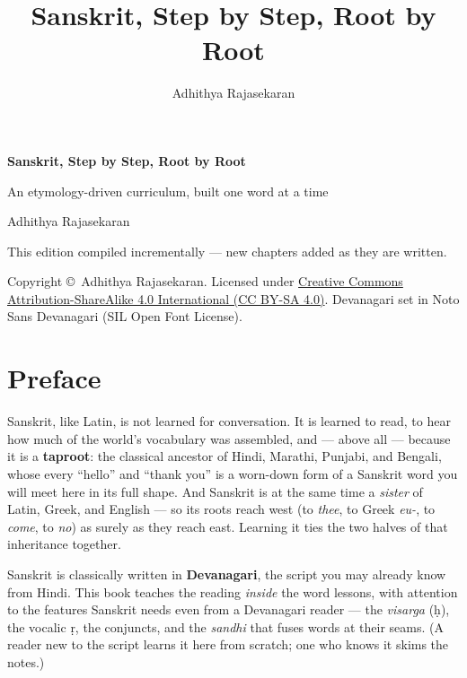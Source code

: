 \documentclass[11pt,twoside]{book}
\title{\Huge Sanskrit, Step by Step, Root by Root}
\author{Adhithya Rajasekaran}
\date{}
\begin{document}
\frontmatter

\begin{titlepage}
  \centering
  \vspace*{3cm}
  {\Huge\bfseries Sanskrit, Step by Step, Root by Root\par}
  \vspace{1cm}
  {\Large An etymology-driven curriculum, built one word at a time\par}
  \vspace{1.5cm}
  {\large Adhithya Rajasekaran\par}
  \vfill
  {\large This edition compiled incrementally --- new chapters added as they
  are written.\par}
  \vspace{2cm}
  {\normalsize
    Copyright \copyright\ Adhithya Rajasekaran. Licensed under
    \href{https://creativecommons.org/licenses/by-sa/4.0/}%
    {Creative Commons Attribution-ShareAlike 4.0 International (CC BY-SA 4.0)}.
    Devanagari set in Noto Sans Devanagari (SIL Open Font License).\par
  }
\end{titlepage}

\chapter*{Preface}

Sanskrit, like Latin, is not learned for conversation. It is learned to read,
to hear how much of the world's vocabulary was assembled, and --- above all ---
because it is a \textbf{taproot}: the classical ancestor of
Hindi, Marathi, Punjabi, and Bengali, whose every ``hello'' and
``thank you'' is a worn-down form of a Sanskrit word you will meet here in its
full shape. And Sanskrit is at the same time a \emph{sister} of Latin, Greek, and
English --- so its roots reach west (to \emph{thee}, to Greek \emph{eu-}, to
\emph{come}, to \emph{no}) as surely as they reach east. Learning it ties the two
halves of that inheritance together.

Sanskrit is classically written in \textbf{Devanagari}, the script you may
already know from Hindi. This book teaches the reading \emph{inside} the word
lessons, with attention to the features Sanskrit needs even from a Devanagari
reader --- the \emph{visarga} (\d{h}), the vocalic \d{r}, the conjuncts, and the
\emph{sandhi} that fuses words at their seams. (A reader new to the script learns
it here from scratch; one who knows it skims the notes.)
\end{document}
